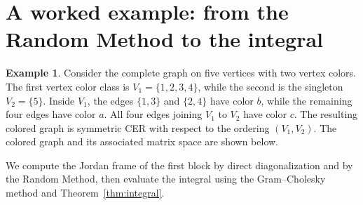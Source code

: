 \documentclass[12pt]{amsart}
\theoremstyle{plain}
\theoremstyle{definition}
\newtheorem{example}[theorem]{Example}
\theoremstyle{remark}
\newcommand{\1}{\mathbf{1}}
\begin{document}
\section{A worked example: from the Random Method to the integral}\label{subsec:random_method_example}
\begin{example}\label{ex:random-method-integral}
Consider the complete graph on five vertices with two vertex colors. The first vertex color class is $V_1=\{1,2,3,4\}$, while the second is the singleton $V_2=\{5\}$. Inside $V_1$, the edges $\{1,3\}$ and $\{2,4\}$ have color $b$, while the remaining four edges have color $a$. All four edges joining $V_1$ to $V_2$ have color $c$. The resulting colored graph is symmetric CER with respect to the ordering $(V_1,V_2)$. The colored graph and its associated matrix space are shown below.

We compute the Jordan frame of the first block by direct
diagonalization and by the Random Method, then evaluate
the integral using the Gram--Cholesky method and
Theorem~\ref{thm:integral}.

\begin{center}
    \centering
    \begin{minipage}[c]{0.35\textwidth}
    \centering
\end{minipage}
\end{center}
\end{example}
\end{document}
